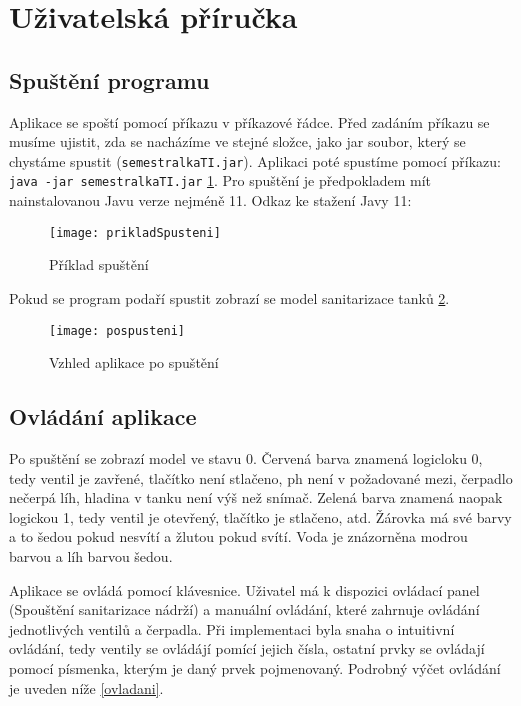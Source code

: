 \documentclass[12pt, a4paper]{article}
\begin{document}
\section{Uživatelská příručka}

\subsection{Spuštění programu}
Aplikace se spoští pomocí příkazu v příkazové řádce. Před zadáním příkazu se musíme ujistit, zda se nacházíme ve stejné složce, jako jar soubor, který se chystáme spustit (\texttt{semestralkaTI.jar}). Aplikaci poté spustíme pomocí příkazu: \texttt{java -jar semestralkaTI.jar} \ref{spusteni}. Pro spuštění je předpokladem mít nainstalovanou Javu verze nejméně 11. Odkaz ke stažení Javy 11: %

\begin{figure}[h]
\centering 
\texttt{[image: prikladSpusteni]}
\caption{Příklad spuštění}
\label{spusteni}
\end{figure}

Pokud se program podaří spustit zobrazí se model sanitarizace tanků \ref{vzhled}.

\begin{figure}[h]
\centering 
\texttt{[image: pospusteni]}
\caption{Vzhled aplikace po spuštění}
\label{vzhled}
\end{figure}

\subsection{Ovládání aplikace}
Po spuštění se zobrazí model ve stavu 0. Červená barva znamená logicloku 0, tedy ventil je zavřené, tlačítko není stlačeno, ph není v požadované mezi, čerpadlo nečerpá líh, hladina v tanku není výš než snímač. Zelená barva znamená naopak logickou 1, tedy ventil je otevřený, tlačítko je stlačeno, atd. Žárovka má své barvy a to šedou pokud nesvítí a žlutou pokud svítí. Voda je znázorněna modrou barvou a líh barvou šedou.

Aplikace se ovládá pomocí klávesnice. Uživatel má k dispozici ovládací panel (Spouštění sanitarizace nádrží) a manuální ovládání, které zahrnuje ovládání jednotlivých ventilů a čerpadla. Při implementaci byla snaha o intuitivní ovládání, tedy ventily se ovládájí pomící jejich čísla, ostatní prvky se ovládají pomocí písmenka, kterým je daný prvek pojmenovaný. Podrobný výčet ovládání je uveden níže \ref{ovladani}.
\end{document}
